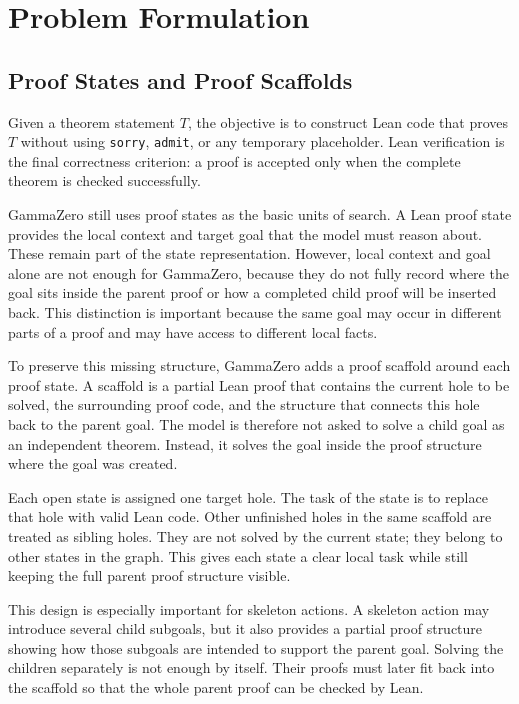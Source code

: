 \documentclass[en]{uet_awesome_thesis/uet-awesome-thesis}
\begin{document}
\chapter{Problem Formulation}
\label{sec:problem-formulation}

\section{Proof States and Proof Scaffolds}

Given a theorem statement \(T\), the objective is to construct Lean code that proves \(T\) without using \texttt{sorry}, \texttt{admit}, or any temporary placeholder. Lean verification is the final correctness criterion: a proof is accepted only when the complete theorem is checked successfully.

GammaZero still uses proof states as the basic units of search. A Lean proof state provides the local context and target goal that the model must reason about. These remain part of the state representation. However, local context and goal alone are not enough for GammaZero, because they do not fully record where the goal sits inside the parent proof or how a completed child proof will be inserted back. This distinction is important because the same goal may occur in different parts of a proof and may have access to different local facts.

To preserve this missing structure, GammaZero adds a proof scaffold around each proof state. A scaffold is a partial Lean proof that contains the current hole to be solved, the surrounding proof code, and the structure that connects this hole back to the parent goal. The model is therefore not asked to solve a child goal as an independent theorem. Instead, it solves the goal inside the proof structure where the goal was created.

Each open state is assigned one target hole. The task of the state is to replace that hole with valid Lean code. Other unfinished holes in the same scaffold are treated as sibling holes. They are not solved by the current state; they belong to other states in the graph. This gives each state a clear local task while still keeping the full parent proof structure visible.

This design is especially important for skeleton actions. A skeleton action may introduce several child subgoals, but it also provides a partial proof structure showing how those subgoals are intended to support the parent goal. Solving the children separately is not enough by itself. Their proofs must later fit back into the scaffold so that the whole parent proof can be checked by Lean.
\end{document}
